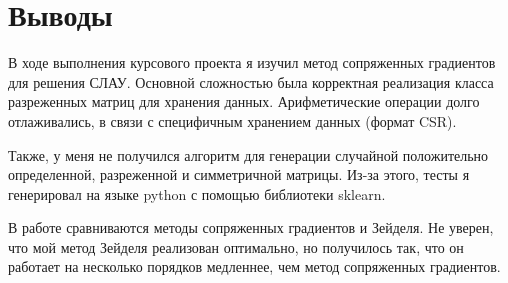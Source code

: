 \section{Выводы}
В ходе выполнения курсового проекта я изучил метод сопряженных градиентов для решения СЛАУ.
Основной сложностью была корректная реализация класса разреженных матриц для хранения данных. Арифметические операции долго отлаживались, в связи с специфичным хранением данных (формат CSR).

Также, у меня не получился алгоритм для генерации случайной положительно определенной, разреженной и симметричной матрицы. Из-за этого, тесты я генерировал на языке python с помощью библиотеки sklearn.

В работе сравниваются методы сопряженных градиентов и Зейделя. Не уверен, что мой метод Зейделя реализован оптимально, но получилось так, что он работает на несколько порядков медленнее, чем метод сопряженных градиентов.

\pagebreak

